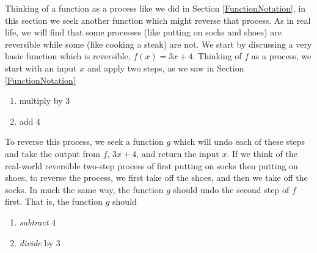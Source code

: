 

\setcounter{footnote}{0}

\label{InverseFunctions}

Thinking of a function as a process like we did in Section \ref{FunctionNotation}, in this section we seek another function which might reverse that process.  As in real life, we will find that some processes (like putting on socks and shoes) are reversible while some (like cooking a steak) are not.  We start by discussing a very basic function which is reversible, $f(x) = 3x+4$.  Thinking of $f$ as a process, we start with an input $x$ and apply two steps, as we saw in Section \ref{FunctionNotation} 

\begin{enumerate}

\item multiply by $3$ 

\item add $4$ 

\end{enumerate}

To reverse this process, we seek a function $g$ which will undo each of these steps and take the output from $f$, $3x+4$, and return the input $x$.  If we think of the real-world reversible two-step process of first putting on socks then putting on shoes, to reverse the process, we first take off the shoes, and then we take off the socks.  In much the same way, the function $g$ should undo the second step of $f$ first.  That is, the function $g$ should

\begin{enumerate}

\item  \textit{subtract} $4$ 

\item  \textit{divide} by $3$

\end{enumerate}

